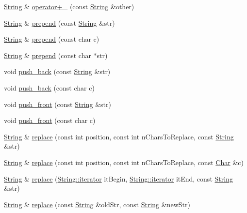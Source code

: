 \begin{DoxyCompactItemize}
\hyperlink{classprism_1_1_string}{String} \& \hyperlink{classprism_1_1_string_a8d509ab7982bc6176c58f5fbce1da15c}{operator+=} (const \hyperlink{classprism_1_1_string}{String} \&other)
\item 
\hyperlink{classprism_1_1_string}{String} \& \hyperlink{classprism_1_1_string_a0deb77daa45d88136d39b9960075cdb5}{prepend} (const \hyperlink{classprism_1_1_string}{String} \&str)
\item 
\hyperlink{classprism_1_1_string}{String} \& \hyperlink{classprism_1_1_string_a8f670c0ad0c7c00cdb89170f4b2275b3}{prepend} (const char c)
\item 
\hyperlink{classprism_1_1_string}{String} \& \hyperlink{classprism_1_1_string_a91f28e14e3febf379ff47a3bda12adab}{prepend} (const char $\ast$str)
\item 
void \hyperlink{classprism_1_1_string_a8e1459833ede719cd6b01ab5ce15d2e5}{push\+\_\+back} (const \hyperlink{classprism_1_1_string}{String} \&str)
\item 
void \hyperlink{classprism_1_1_string_a81b6a39be2a985ea02c46a4d1490755c}{push\+\_\+back} (const char c)
\item 
void \hyperlink{classprism_1_1_string_aadab394ea2370e2d23fcf932d373dcd3}{push\+\_\+front} (const \hyperlink{classprism_1_1_string}{String} \&str)
\item 
void \hyperlink{classprism_1_1_string_a5471ead67f8901cbed6bd43ef9f4a618}{push\+\_\+front} (const char c)
\item 
\hyperlink{classprism_1_1_string}{String} \& \hyperlink{classprism_1_1_string_ad247e96c8abb287d167ebf1b9f37e0ad}{replace} (const int position, const int n\+Chars\+To\+Replace, const \hyperlink{classprism_1_1_string}{String} \&str)
\item 
\hyperlink{classprism_1_1_string}{String} \& \hyperlink{classprism_1_1_string_a4e8a35e0f084e4d382858e231bf5ed31}{replace} (const int position, const int n\+Chars\+To\+Replace, const \hyperlink{classprism_1_1_char}{Char} \&c)
\item 
\hyperlink{classprism_1_1_string}{String} \& \hyperlink{classprism_1_1_string_a0a8ad9ff92bb002dfb4c13625ad93d24}{replace} (\hyperlink{classprism_1_1_string_adacc7975837e5fff95d70690777fb330}{String\+::iterator} it\+Begin, \hyperlink{classprism_1_1_string_adacc7975837e5fff95d70690777fb330}{String\+::iterator} it\+End, const \hyperlink{classprism_1_1_string}{String} \&str)
\item 
\hyperlink{classprism_1_1_string}{String} \& \hyperlink{classprism_1_1_string_a81e268b27da75c013b41e400b2fcb2f1}{replace} (const \hyperlink{classprism_1_1_string}{String} \&old\+Str, const \hyperlink{classprism_1_1_string}{String} \&new\+Str)

\end{DoxyCompactItemize}
